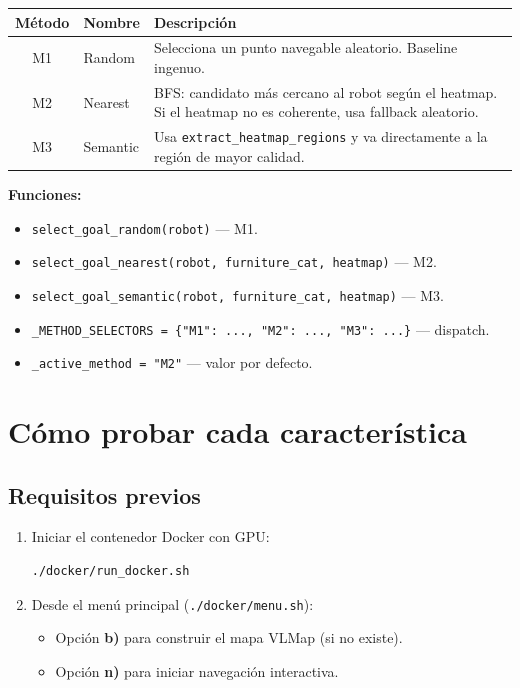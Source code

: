 \documentclass[11pt,a4paper]{article}
\begin{document}
\begin{center}
\begin{tabular}{clp{7cm}}
\toprule
Método & Nombre & Descripción \\
\midrule
M1 & Random      & Selecciona un punto navegable aleatorio. Baseline ingenuo. \\
M2 & Nearest     & BFS: candidato más cercano al robot según el heatmap. Si el heatmap no es coherente, usa fallback aleatorio. \\
M3 & Semantic    & Usa \texttt{extract\_heatmap\_regions} y va directamente a la región de mayor calidad. \\
\bottomrule
\end{tabular}
\end{center}

\textbf{Funciones:}
\begin{itemize}
  \item \texttt{select\_goal\_random(robot)} --- M1.
  \item \texttt{select\_goal\_nearest(robot, furniture\_cat, heatmap)} --- M2.
  \item \texttt{select\_goal\_semantic(robot, furniture\_cat, heatmap)} --- M3.
  \item \texttt{\_METHOD\_SELECTORS = \{"M1": ..., "M2": ..., "M3": ...\}} --- dispatch.
  \item \texttt{\_active\_method = "M2"} --- valor por defecto.
\end{itemize}

\section{Cómo probar cada característica}

\subsection{Requisitos previos}

\begin{enumerate}
  \item Iniciar el contenedor Docker con GPU:
\begin{lstlisting}
./docker/run_docker.sh
\end{lstlisting}
  \item Desde el menú principal (\texttt{./docker/menu.sh}):
        \begin{itemize}
          \item Opción \textbf{b)} para construir el mapa VLMap (si no existe).
          \item Opción \textbf{n)} para iniciar navegación interactiva.
        \end{itemize}
\end{enumerate}
\end{document}
